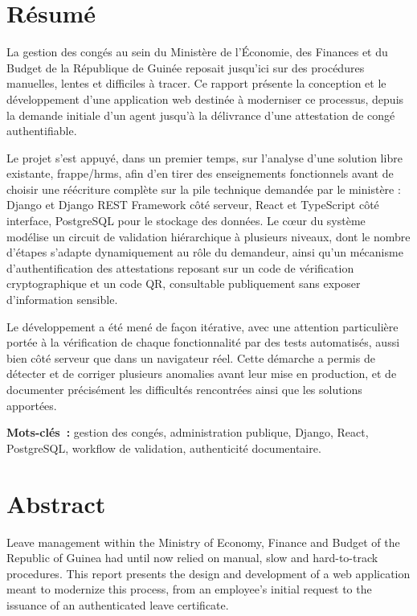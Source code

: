 \chapter*{Résumé}

La gestion des congés au sein du Ministère de l'Économie, des Finances et du Budget de la République de Guinée reposait jusqu'ici sur des procédures manuelles, lentes et difficiles à tracer. Ce rapport présente la conception et le développement d'une application web destinée à moderniser ce processus, depuis la demande initiale d'un agent jusqu'à la délivrance d'une attestation de congé authentifiable.

Le projet s'est appuyé, dans un premier temps, sur l'analyse d'une solution libre existante, frappe/hrms, afin d'en tirer des enseignements fonctionnels avant de choisir une réécriture complète sur la pile technique demandée par le ministère : Django et Django REST Framework côté serveur, React et TypeScript côté interface, PostgreSQL pour le stockage des données. Le cœur du système modélise un circuit de validation hiérarchique à plusieurs niveaux, dont le nombre d'étapes s'adapte dynamiquement au rôle du demandeur, ainsi qu'un mécanisme d'authentification des attestations reposant sur un code de vérification cryptographique et un code QR, consultable publiquement sans exposer d'information sensible.

Le développement a été mené de façon itérative, avec une attention particulière portée à la vérification de chaque fonctionnalité par des tests automatisés, aussi bien côté serveur que dans un navigateur réel. Cette démarche a permis de détecter et de corriger plusieurs anomalies avant leur mise en production, et de documenter précisément les difficultés rencontrées ainsi que les solutions apportées.

\vspace{0.5cm}
\noindent\textbf{Mots-clés~:} gestion des congés, administration publique, Django, React, PostgreSQL, workflow de validation, authenticité documentaire.

\vspace{1cm}
\chapter*{Abstract}

Leave management within the Ministry of Economy, Finance and Budget of the Republic of Guinea had until now relied on manual, slow and hard-to-track procedures. This report presents the design and development of a web application meant to modernize this process, from an employee's initial request to the issuance of an authenticated leave certificate.

